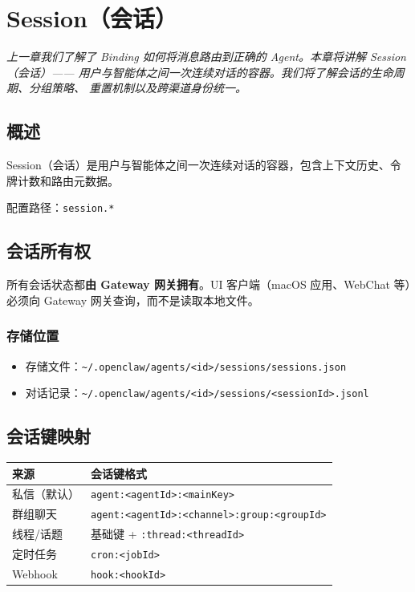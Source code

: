\chapter{Session（会话）}

\vspace{0.5em}
\noindent\textit{上一章我们了解了 Binding 如何将消息路由到正确的 Agent。本章将讲解 Session（会话）——
用户与智能体之间一次连续对话的容器。我们将了解会话的生命周期、分组策略、
重置机制以及跨渠道身份统一。}
\vspace{0.5em}

\section{概述}

Session（会话）是用户与智能体之间一次连续对话的容器，包含上下文历史、令牌计数和路由元数据。

配置路径：\texttt{session.*}

\section{会话所有权}

所有会话状态都\textbf{由 Gateway 网关拥有}。UI 客户端（macOS 应用、WebChat 等）必须向 Gateway 网关查询，而不是读取本地文件。

\subsection{存储位置}

\begin{itemize}
  \item 存储文件：\texttt{\textasciitilde{}/.openclaw/agents/<id>/sessions/sessions.json}
  \item 对话记录：\texttt{\textasciitilde{}/.openclaw/agents/<id>/sessions/<sessionId>.jsonl}
\end{itemize}

\section{会话键映射}

\begin{center}
\begin{tabular}{ll}
\toprule
\textbf{来源} & \textbf{会话键格式} \\
\midrule
私信（默认） & \texttt{agent:<agentId>:<mainKey>} \\
群组聊天 & \texttt{agent:<agentId>:<channel>:group:<groupId>} \\
线程/话题 & 基础键 + \texttt{:thread:<threadId>} \\
定时任务 & \texttt{cron:<jobId>} \\
Webhook & \texttt{hook:<hookId>} \\
\bottomrule
\end{tabular}
\end{center}

